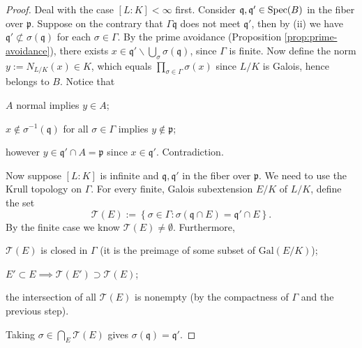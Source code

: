 \begin{proof}
	Deal with the case $[L:K] < \infty$ first. Consider $\mathfrak{q}, \mathfrak{q}' \in \operatorname{Spec}(B)$ in the fiber over $\mathfrak{p}$. Suppose on the contrary that $\Gamma \mathfrak{q}$ does not meet $\mathfrak{q}'$, then by (ii) we have $\mathfrak{q}' \not\subset \sigma(\mathfrak{q})$ for each $\sigma \in \Gamma$. By the prime avoidance (Proposition \ref{prop:prime-avoidance}), there exists $x \in \mathfrak{q}' \smallsetminus \bigcup_\sigma \sigma(\mathfrak{q})$, since $\Gamma$ is finite. Now define the norm $y := N_{L/K}(x) \in K$, which equals $\prod_{\sigma \in \Gamma} \sigma(x)$ since $L/K$ is Galois, hence belongs to $B$. Notice that
	\begin{compactitem}
		\item $A$ normal implies $y \in A$;
		\item $x \notin \sigma^{-1}(\mathfrak{q})$ for all $\sigma \in \Gamma$ implies $y \notin \mathfrak{p}$;
		\item however $y \in \mathfrak{q}' \cap A = \mathfrak{p}$ since $x \in \mathfrak{q}'$. Contradiction.
	\end{compactitem}
	
	Now suppose $[L:K]$ is infinite and $\mathfrak{q}, \mathfrak{q}'$ in the fiber over $\mathfrak{p}$. We need to use the Krull topology on $\Gamma$. For every finite, Galois subextension $E/K$ of $L/K$, define the set
	\[ \mathcal{T}(E) := \left\{ \sigma \in \Gamma: \sigma(\mathfrak{q} \cap E) = \mathfrak{q}' \cap E \right\}.  \]
	By the finite case we know $\mathcal{T}(E) \neq \emptyset$. Furthermore,
	\begin{compactitem}
		\item $\mathcal{T}(E)$ is closed in $\Gamma$ (it is the preimage of some subset of $\text{Gal}(E/K)$);
		\item $E' \subset E \implies \mathcal{T}(E') \supset \mathcal{T}(E)$;
		\item the intersection of all $\mathcal{T}(E)$ is nonempty (by the compactness of $\Gamma$ and the previous step).
	\end{compactitem}
	Taking $\sigma \in \bigcap_E \mathcal{T}(E)$ gives $\sigma(\mathfrak{q}) = \mathfrak{q}'$.


\end{proof}
